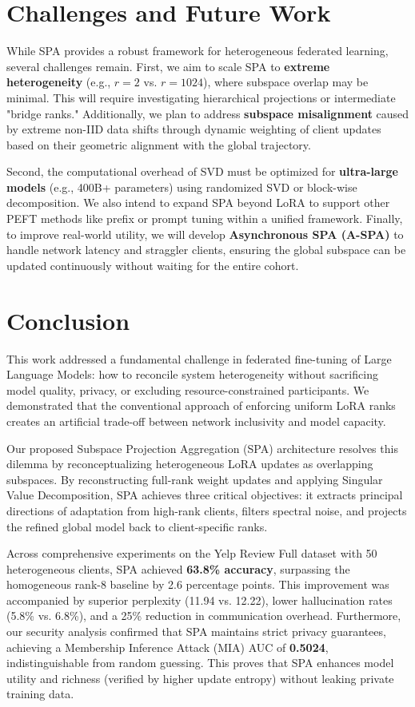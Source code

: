 \documentclass[conference]{IEEEtran}
\begin{document}
\section{Challenges and Future Work}
\label{sec:limitations}

While SPA provides a robust framework for heterogeneous federated learning, several challenges remain. First, we aim to scale SPA to \textbf{extreme heterogeneity} (e.g., $r=2$ vs. $r=1024$), where subspace overlap may be minimal. This will require investigating hierarchical projections or intermediate "bridge ranks." Additionally, we plan to address \textbf{subspace misalignment} caused by extreme non-IID data shifts through dynamic weighting of client updates based on their geometric alignment with the global trajectory.

Second, the computational overhead of SVD must be optimized for \textbf{ultra-large models} (e.g., 400B+ parameters) using randomized SVD or block-wise decomposition. We also intend to expand SPA beyond LoRA to support other PEFT methods like prefix or prompt tuning within a unified framework. Finally, to improve real-world utility, we will develop \textbf{Asynchronous SPA (A-SPA)} to handle network latency and straggler clients, ensuring the global subspace can be updated continuously without waiting for the entire cohort.

\section{Conclusion}
This work addressed a fundamental challenge in federated fine-tuning of Large Language Models: how to reconcile system heterogeneity without sacrificing model quality, privacy, or excluding resource-constrained participants. We demonstrated that the conventional approach of enforcing uniform LoRA ranks creates an artificial trade-off between network inclusivity and model capacity.

Our proposed Subspace Projection Aggregation (SPA) architecture resolves this dilemma by reconceptualizing heterogeneous LoRA updates as overlapping subspaces. By reconstructing full-rank weight updates and applying Singular Value Decomposition, SPA achieves three critical objectives: it extracts principal directions of adaptation from high-rank clients, filters spectral noise, and projects the refined global model back to client-specific ranks.

Across comprehensive experiments on the Yelp Review Full dataset with 50 heterogeneous clients, SPA achieved \textbf{63.8\% accuracy}, surpassing the homogeneous rank-8 baseline by 2.6 percentage points. This improvement was accompanied by superior perplexity (11.94 vs. 12.22), lower hallucination rates (5.8\% vs. 6.8\%), and a 25\% reduction in communication overhead. Furthermore, our security analysis confirmed that SPA maintains strict privacy guarantees, achieving a Membership Inference Attack (MIA) AUC of \textbf{0.5024}, indistinguishable from random guessing. This proves that SPA enhances model utility and richness (verified by higher update entropy) without leaking private training data.
\end{document}
